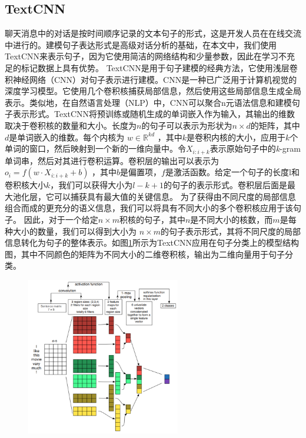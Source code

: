 \subsection{TextCNN}
聊天消息中的对话是按时间顺序记录的文本句子的形式，这是开发人员在在线交流中进行的。建模句子表达形式是高级对话分析的基础，在本文中，我们使用TextCNN\cite{kim2014convolutional}来表示句子，因为它使用简洁的网络结构和少量参数，因此在学习不充足的标记数据上具有优势。
TextCNN是用于句子建模的经典方法，它使用浅层卷积神经网络（CNN）\cite{krizhevsky2012imagenet}对句子表示进行建模。CNN是一种已广泛用于计算机视觉的深度学习模型。它使用几个卷积核捕获局部信息，然后使用这些局部信息生成全局表示。类似地，在自然语言处理（NLP）中，CNN可以聚合n元语法信息和建模句子表示形式。TextCNN将预训练或随机生成的单词嵌入作为输入，其输出的维数取决于卷积核的数量和大小。长度为$n$的句子可以表示为形状为$n\times d$的矩阵，其中$d$是单词嵌入的维数。每个内核为 $w \in \mathbb{R}^{kd}$ ，其中$k$是卷积内核的大小，应用于$k$个单词的窗口，然后映射到一个新的一维向量中。令$X_{i:i+k}$表示原始句子中的\textit{k}-gram单词串，然后对其进行卷积运算。卷积层的输出可以表示为$o_i=f(w\cdot X_{i:i+k} + b)$ ，其中$b$是偏置项，$f$是激活函数。给定一个句子的长度l和卷积核大小$k$，我们可以获得大小为$l-k+1$的句子的表示形式。卷积层后面是最大池化层，它可以捕获具有最大值的关键信息。
为了获得由不同尺度的局部信息组合而成的更充分的语义信息，我们可以将具有不同大小的多个卷积核应用于该句子。 因此，对于一个给定$n \times m$积核的句子，其中$n$是不同大小的核数，而$m$是每种大小的数量，我们可以得到大小为 $n\times m$的句子表示形式，其将不同尺度的局部信息转化为句子的整体表示。如图\ref{fig:textcnn}所示为TextCNN应用在句子分类上的模型结构图，其中不同颜色的矩阵为不同大小的二维卷积核，输出为二维向量用于句子分类。
\begin{figure}[htbp]
    \centering
    \includegraphics[width=0.6\textwidth]{Img/textcnn.png}
    \label{fig:textcnn}
\end{figure}

